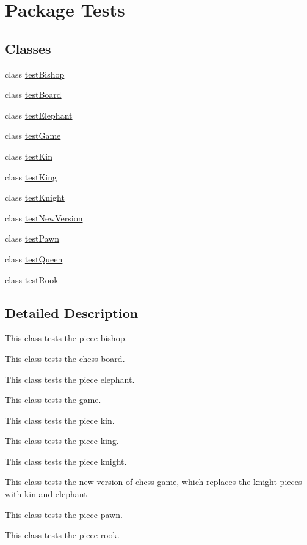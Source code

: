 \hypertarget{namespace_tests}{}\section{Package Tests}
\label{namespace_tests}
\subsection*{Classes}
\begin{DoxyCompactItemize}
\item 
class \hyperlink{class_tests_1_1test_bishop}{test\+Bishop}
\item 
class \hyperlink{class_tests_1_1test_board}{test\+Board}
\item 
class \hyperlink{class_tests_1_1test_elephant}{test\+Elephant}
\item 
class \hyperlink{class_tests_1_1test_game}{test\+Game}
\item 
class \hyperlink{class_tests_1_1test_kin}{test\+Kin}
\item 
class \hyperlink{class_tests_1_1test_king}{test\+King}
\item 
class \hyperlink{class_tests_1_1test_knight}{test\+Knight}
\item 
class \hyperlink{class_tests_1_1test_new_version}{test\+New\+Version}
\item 
class \hyperlink{class_tests_1_1test_pawn}{test\+Pawn}
\item 
class \hyperlink{class_tests_1_1test_queen}{test\+Queen}
\item 
class \hyperlink{class_tests_1_1test_rook}{test\+Rook}
\end{DoxyCompactItemize}


\subsection{Detailed Description}
This class tests the piece bishop.

This class tests the chess board.

This class tests the piece elephant.

This class tests the game.

This class tests the piece kin.

This class tests the piece king.

This class tests the piece knight.

This class tests the new version of chess game, which replaces the knight pieces with kin and elephant

This class tests the piece pawn.

This class tests the piece rook. 